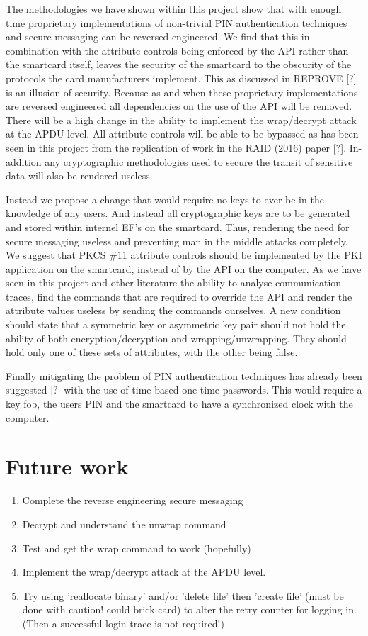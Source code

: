\documentclass[bsc,frontabs,twoside,singlespacing,parskip,deptreport]{infthesis}     %
\begin{document}
The methodologies we have shown within this project show that with enough time proprietary implementations of non-trivial PIN authentication techniques and secure messaging can be reversed engineered. We find that this in combination with the attribute controls being enforced by the API rather than the smartcard itself, leaves the security of the smartcard to the obscurity of the protocols the card manufacturers implement. This as discussed in REPROVE [?] is an illusion of security. Because as and when these proprietary implementations are reversed engineered all dependencies on the use of the API will be removed. There will be a high change in the ability to implement the wrap/decrypt attack at the APDU level. All attribute controls will be able to be bypassed as has been seen in this project from the replication of work in the RAID (2016) paper [?]. In-addition any cryptographic methodologies used to secure the transit of sensitive data will also be rendered useless.

Instead we propose a change that would require no keys to ever be in the knowledge of any users. And instead all cryptographic keys are to be generated and stored within internel EF's on the smartcard. Thus, rendering the need for secure messaging useless and preventing man in the middle attacks completely. We suggest that PKCS \#11 attribute controls should be implemented by the PKI application on the smartcard, instead of by the API on the computer. As we have seen in this project and other literature the ability to analyse communication traces, find the commands that are required to override the API and render the attribute values useless by sending the commands ourselves. A new condition should state that a symmetric key or asymmetric key pair should not hold the ability of both encryption/decryption and wrapping/unwrapping. They should hold only one of these sets of attributes, with the other being false.

Finally mitigating the problem of PIN authentication techniques has already been suggested [?] with the use of time based one time passwords. This would require a key fob, the users PIN and the smartcard to have a synchronized clock with the computer. 

\chapter{Future work}

\begin{enumerate}
\item Complete the reverse engineering secure messaging
\item Decrypt and understand the unwrap command
\item Test and get the wrap command to work (hopefully)
\item Implement the wrap/decrypt attack at the APDU level.

\item Try using 'reallocate binary' and/or 'delete file' then 'create file' (must be done with caution! could brick card) to alter the retry counter for logging in. (Then a successful login trace is not required!)
\end{enumerate}
\end{document}
